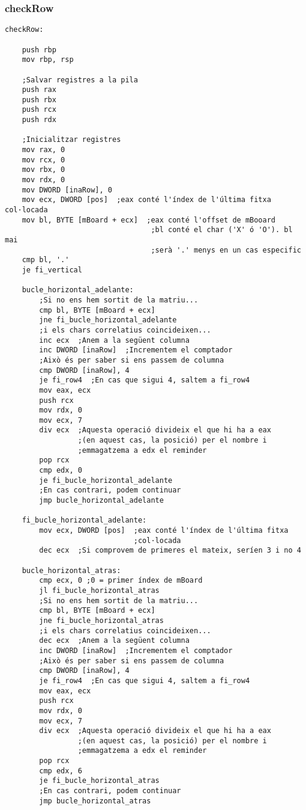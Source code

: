 \documentclass[a4paper,12pt]{article}
\begin{document}
\subsubsection{checkRow}
\begin{lstlisting}[firstnumber=524]
checkRow:

	push rbp
	mov rbp, rsp
	
	;Salvar registres a la pila
	push rax
    push rbx
    push rcx
    push rdx

    ;Inicialitzar registres
    mov rax, 0
    mov rcx, 0
    mov rbx, 0
    mov rdx, 0
    mov DWORD [inaRow], 0
    mov ecx, DWORD [pos]  ;eax conté l'índex de l'última fitxa col·locada
    mov bl, BYTE [mBoard + ecx]  ;eax conté l'offset de mBooard
                                  ;bl conté el char ('X' ó 'O'). bl mai
                                  ;serà '.' menys en un cas especific
    cmp bl, '.'
    je fi_vertical
    
	bucle_horizontal_adelante:
		;Si no ens hem sortit de la matriu...
		cmp bl, BYTE [mBoard + ecx]
        jne fi_bucle_horizontal_adelante
        ;i els chars correlatius coincideixen...
        inc ecx  ;Anem a la següent columna
        inc DWORD [inaRow]  ;Incrementem el comptador
        ;Això és per saber si ens passem de columna
        cmp DWORD [inaRow], 4
        je fi_row4  ;En cas que sigui 4, saltem a fi_row4
        mov eax, ecx
        push rcx
        mov rdx, 0
        mov ecx, 7
        div ecx  ;Aquesta operació divideix el que hi ha a eax
				 ;(en aquest cas, la posició) per el nombre i
				 ;emmagatzema a edx el reminder
        pop rcx
        cmp edx, 0
        je fi_bucle_horizontal_adelante
        ;En cas contrari, podem continuar
        jmp bucle_horizontal_adelante

    fi_bucle_horizontal_adelante:
        mov ecx, DWORD [pos]  ;eax conté l'índex de l'última fitxa
							  ;col·locada
        dec ecx  ;Si comprovem de primeres el mateix, seríen 3 i no 4

    bucle_horizontal_atras:
        cmp ecx, 0 ;0 = primer índex de mBoard
        jl fi_bucle_horizontal_atras
        ;Si no ens hem sortit de la matriu...
        cmp bl, BYTE [mBoard + ecx]
        jne fi_bucle_horizontal_atras
        ;i els chars correlatius coincideixen...
        dec ecx  ;Anem a la següent columna
        inc DWORD [inaRow]  ;Incrementem el comptador
        ;Això és per saber si ens passem de columna
        cmp DWORD [inaRow], 4
        je fi_row4  ;En cas que sigui 4, saltem a fi_row4
        mov eax, ecx
        push rcx
        mov rdx, 0
        mov ecx, 7
        div ecx  ;Aquesta operació divideix el que hi ha a eax
				 ;(en aquest cas, la posició) per el nombre i
				 ;emmagatzema a edx el reminder
        pop rcx
        cmp edx, 6
        je fi_bucle_horizontal_atras
        ;En cas contrari, podem continuar
        jmp bucle_horizontal_atras


\end{lstlisting}
\end{document}
